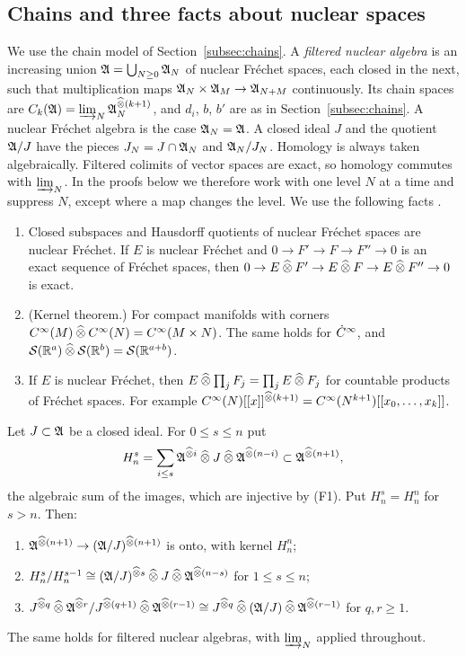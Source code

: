\subsection{Chains and three facts about nuclear spaces}\label{ha:subsec:facts}

We use the chain model of Section~\ref{subsec:chains}. A \emph{filtered
nuclear algebra} is an increasing union \(\mathfrak A=\bigcup_{N\ge0}\mathfrak A_N\) of
nuclear Fr\'echet spaces, each closed in the next, such that
multiplication maps \(\mathfrak A_N\times\mathfrak A_M\to\mathfrak A_{N+M}\) continuously. Its
chain spaces are \(C_k(\mathfrak A)=\varinjlim_N\mathfrak A_N^{\mathbin{\widehat\otimes}(k+1)}\), and \(d_i\),
\(b\), \(b'\) are as in Section~\ref{subsec:chains}. A nuclear Fr\'echet
algebra is the case \(\mathfrak A_N=\mathfrak A\). A closed ideal \(J\) and the quotient
\(\mathfrak A/J\) have the pieces \(J_N=J\cap\mathfrak A_N\) and \(\mathfrak A_N/J_N\). Homology
is always taken algebraically. Filtered colimits of vector spaces are
exact, so homology commutes with \(\varinjlim_N\). In the proofs below we
therefore work with one level \(N\) at a time and suppress \(N\), except
where a map changes the level. We use the following facts
\cite[Chs.~43, 50, 51]{Treves}.
\begin{enumerate}
\item[(F1)] Closed subspaces and Hausdorff quotients of nuclear Fr\'echet
spaces are nuclear Fr\'echet. If \(E\) is nuclear Fr\'echet and
\(0\to F'\to F\to F''\to0\) is an exact sequence of Fr\'echet spaces, then
\(0\to E\mathbin{\widehat\otimes} F'\to E\mathbin{\widehat\otimes} F\to E\mathbin{\widehat\otimes} F''\to0\) is exact.
\item[(F2)] (Kernel theorem.) For compact manifolds with corners
\(C^\infty(M)\mathbin{\widehat\otimes}C^\infty(N)=C^\infty(M\times N)\). The same holds for \(\dot C^\infty\), and
\(\mathcal S(\mathbb R^a)\mathbin{\widehat\otimes}\mathcal S(\mathbb R^b)=\mathcal S(\mathbb R^{a+b})\).
\item[(F3)] If \(E\) is nuclear Fr\'echet, then \(E\mathbin{\widehat\otimes}\prod_jF_j=
\prod_jE\mathbin{\widehat\otimes} F_j\) for countable products of Fr\'echet spaces. For
example \(C^\infty(N)[[x]]^{\mathbin{\widehat\otimes}(k+1)}=C^\infty(N^{k+1})[[x_0,\dots,x_k]]\).
\end{enumerate}

\begin{lemma}\label{ha:lem:exact}
Let \(J\subset\mathfrak A\) be a closed ideal. For \(0\le s\le n\) put
\[
 H^s_n=\sum_{i\le s}\mathfrak A^{\mathbin{\widehat\otimes} i}\mathbin{\widehat\otimes} J\mathbin{\widehat\otimes}\mathfrak A^{\mathbin{\widehat\otimes}(n-i)}
 \subset\mathfrak A^{\mathbin{\widehat\otimes}(n+1)},
\]
the algebraic sum of the images, which are injective by (F1). Put
\(H^s_n=H^n_n\) for \(s>n\). Then:
\begin{enumerate}
\item \(\mathfrak A^{\mathbin{\widehat\otimes}(n+1)}\to(\mathfrak A/J)^{\mathbin{\widehat\otimes}(n+1)}\) is onto, with kernel
\(H^n_n\);
\item \(H^s_n/H^{s-1}_n\cong(\mathfrak A/J)^{\mathbin{\widehat\otimes} s}\mathbin{\widehat\otimes} J\mathbin{\widehat\otimes}\mathfrak A^{\mathbin{\widehat\otimes}(n-s)}\) for
\(1\le s\le n\);
\item \(J^{\mathbin{\widehat\otimes} q}\mathbin{\widehat\otimes}\mathfrak A^{\mathbin{\widehat\otimes} r}/J^{\mathbin{\widehat\otimes}(q+1)}\mathbin{\widehat\otimes}\mathfrak A^{\mathbin{\widehat\otimes}(r-1)}\cong
J^{\mathbin{\widehat\otimes} q}\mathbin{\widehat\otimes}(\mathfrak A/J)\mathbin{\widehat\otimes}\mathfrak A^{\mathbin{\widehat\otimes}(r-1)}\) for \(q,r\ge1\).
\end{enumerate}
The same holds for filtered nuclear algebras, with \(\varinjlim_N\)
applied throughout.
\end{lemma}

